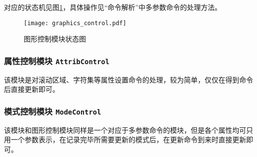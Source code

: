 	对应的状态机见图\ref{fig:graphics_control}，具体操作见``命令解析''中多参数命令的处理方法。
\begin{figure}[htbp]
\centerline{
\texttt{[image: graphics\_control.pdf]}
}
\caption{图形控制模块状态图}
\label{fig:graphics_control}
\end{figure}
\subsubsection{属性控制模块 \texttt{AttribControl}}
该模块是对滚动区域、字符集等属性设置命令的处理，较为简单，仅仅在得到命令后直接更新即可。
\subsubsection{模式控制模块 \texttt{ModeControl}}
该模块和图形控制模块同样是一个对应于多参数命令的模块，但是各个属性均可只用一个参数表示，在记录完毕所需要更新的模式后，在更新命令到来时直接更新即可。
